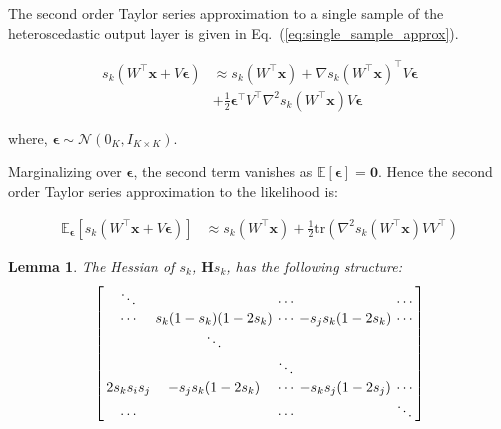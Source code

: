 \documentclass[final]{cvpr}
\newtheorem{lemma}[theorem]{Lemma}
\newcommand{\brac}[1]{\left[#1\right]}
\begin{document}
The second order Taylor series approximation to a single sample of the heteroscedastic output layer is given in Eq.~(\ref{eq:single_sample_approx}).

\begin{equation}
\begin{split}
    s_k(W^\intercal \mathbf{x} + V \boldsymbol{\epsilon}) &\approx s_k(W^\intercal \mathbf{x}) + \nabla s_k(W^\intercal \mathbf{x})^\intercal V \boldsymbol{\epsilon}\\ & + \frac{1}{2} \boldsymbol{\epsilon}^\intercal V^\intercal \nabla^2 s_k(W^\intercal \mathbf{x}) V \boldsymbol{\epsilon}
\end{split}
\label{eq:single_sample_approx}    
\end{equation}

where, $\boldsymbol{\epsilon} \sim \mathcal{N}(0_K, I_{K\times K})$.

Marginalizing over $\boldsymbol{\epsilon}$, the second term vanishes as $\mathbb{E} \brac{\boldsymbol{\epsilon}} = \boldsymbol{0}$. Hence the second order Taylor series approximation to the likelihood is:

\begin{equation}
\begin{split}
    \mathbb{E}_{\boldsymbol{\epsilon}} \brac{s_k(W^\intercal \mathbf{x} + V \boldsymbol{\epsilon})} &\approx s_k(W^\intercal \mathbf{x}) + \frac{1}{2} \textrm{tr}(\nabla^2 s_k(W^\intercal \mathbf{x}) V V^\intercal)
\end{split}
\label{eq:log_likelihood_approx}    
\end{equation}

\begin{lemma}
The Hessian of $s_k$, $\mathbf{H} s_k$, has the following structure:
\begin{equation*}
\left[\arraycolsep=1.8pt
\begin{array}{ccccc}
\ddots     &  & \cdots   & & \cdots\\
\cdots     & s_k (1 - s_k) (1 - 2 s_k)  & \cdots  & - s_j s_k (1 - 2 s_k) & \cdots \\
     & \ddots &  & & \\
     & & \ddots &  & \\
 2 s_k s_i s_j     & - s_j s_k (1 - 2 s_k)   & \cdots & - s_k s_j (1 - 2 s_j) & \cdots \\
\cdots     &       & \cdots  &   & \ddots
\end{array}
\right]
\end{equation*}
\end{lemma}
\end{document}
